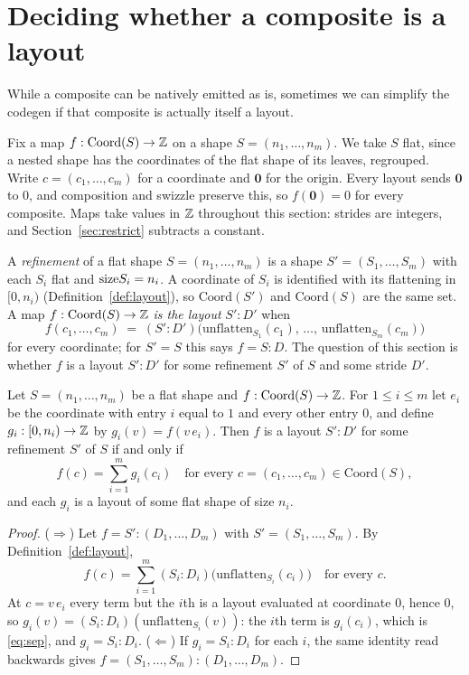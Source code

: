 \section{Deciding whether a composite is a layout}\label{sec:decide}

While a composite can be natively emitted as is, sometimes we can simplify the codegen
if that composite is actually itself a layout.

Fix a map $f : \mathrm{Coord}(S) \to \mathbb{Z}$ on a shape $S = (n_1,\dots,n_m)$.
We take $S$ flat, since a nested shape has the coordinates of the flat shape
of its leaves, regrouped. Write $c = (c_1,\dots,c_m)$ for a coordinate and
$\mathbf{0}$ for the origin. Every layout sends $\mathbf{0}$ to $0$, and
composition and swizzle preserve this, so $f(\mathbf{0}) = 0$ for every
composite. Maps take values in $\mathbb{Z}$ throughout this section: strides are
integers, and Section~\ref{sec:restrict} subtracts a constant.

\begin{definition}[Refinement]\label{def:refine}
A \emph{refinement} of a flat shape $S = (n_1,\dots,n_m)$ is a shape
$S' = (S_1,\dots,S_m)$ with each $S_i$ flat and $\mathrm{size} S_i = n_i$. A
coordinate of $S_i$ is identified with its flattening in $[0,n_i)$
(Definition~\ref{def:layout}), so $\mathrm{Coord}(S')$ and $\mathrm{Coord}(S)$
are the same set. A map $f : \mathrm{Coord}(S) \to \mathbb{Z}$ \emph{is the layout}
$S'{:}D'$ when
\[
f(c_1,\dots,c_m) \;=\;
(S'{:}D')\big(\mathrm{unflatten}_{S_1}(c_1),\,\dots,\,\mathrm{unflatten}_{S_m}(c_m)\big)
\]
for every coordinate; for $S' = S$ this says $f = S{:}D$. The question of
this section is whether $f$ is a layout $S'{:}D'$ for some refinement $S'$ of
$S$ and some stride $D'$.
\end{definition}

\begin{lemma}[Separability]\label{lem:separable}
Let $S = (n_1,\dots,n_m)$ be a flat shape and $f : \mathrm{Coord}(S) \to \mathbb{Z}$.
For $1 \le i \le m$ let $e_i$ be the coordinate with entry $i$ equal to $1$
and every other entry $0$, and define $g_i : [0,n_i) \to \mathbb{Z}$ by
$g_i(v) = f(v\,e_i)$. Then $f$ is a layout $S'{:}D'$ for some refinement $S'$
of $S$ if and only if
\begin{equation}\label{eq:sep}
f(c) = \sum_{i=1}^{m} g_i(c_i)
\quad\text{for every } c = (c_1,\dots,c_m) \in \mathrm{Coord}(S),
\end{equation}
and each $g_i$ is a layout of some flat shape of size $n_i$.
\end{lemma}
\begin{proof}
($\Rightarrow$) Let $f = S'{:}(D_1,\dots,D_m)$ with $S' = (S_1,\dots,S_m)$.
By Definition~\ref{def:layout},
\[
f(c) = \sum_{i=1}^{m} (S_i{:}D_i)\big(\mathrm{unflatten}_{S_i}(c_i)\big)
\quad\text{for every } c.
\]
At $c = v\,e_i$ every term but the $i$th is a layout evaluated at coordinate
$0$, hence $0$, so $g_i(v) = (S_i{:}D_i)(\mathrm{unflatten}_{S_i}(v))$: the
$i$th term is $g_i(c_i)$, which is \eqref{eq:sep}, and $g_i = S_i{:}D_i$.
($\Leftarrow$) If $g_i = S_i{:}D_i$ for each $i$, the same identity read
backwards gives $f = (S_1,\dots,S_m){:}(D_1,\dots,D_m)$.
\end{proof}

